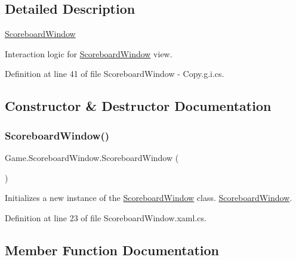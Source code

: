 \subsection{Detailed Description}
\mbox{\hyperlink{class_game_1_1_scoreboard_window}{Scoreboard\+Window}} 

Interaction logic for \mbox{\hyperlink{class_game_1_1_scoreboard_window}{Scoreboard\+Window}} view.

Definition at line 41 of file Scoreboard\+Window -\/ Copy.\+g.\+i.\+cs.



\subsection{Constructor \& Destructor Documentation}
\mbox{\label{class_game_1_1_scoreboard_window_addded69df55ff58a3160d2b5ad217826}} 
\subsubsection{\texorpdfstring{ScoreboardWindow()}{ScoreboardWindow()}}
{\footnotesize\ttfamily Game.\+Scoreboard\+Window.\+Scoreboard\+Window (\begin{DoxyParamCaption}{ }\end{DoxyParamCaption})}



Initializes a new instance of the \mbox{\hyperlink{class_game_1_1_scoreboard_window}{Scoreboard\+Window}} class. \mbox{\hyperlink{class_game_1_1_scoreboard_window}{Scoreboard\+Window}}. 



Definition at line 23 of file Scoreboard\+Window.\+xaml.\+cs.



\subsection{Member Function Documentation}
\mbox{\label{class_game_1_1_scoreboard_window_a6579ede7390dda7349bb34ee46a917d7}} 
